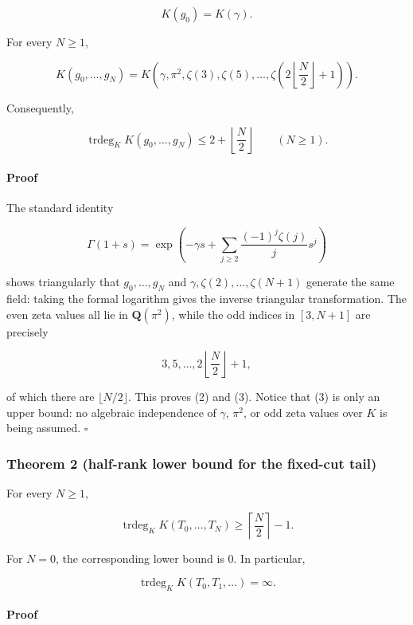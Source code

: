 \[
 K(g_0)=K(\gamma).
\]

For every \(N\ge1\),

\[
 \boxed{
 K(g_0,\ldots,g_N)
 =K\!\left(\gamma,\pi^2,\zeta(3),\zeta(5),\ldots,
 \zeta\!\left(2\left\lfloor\frac N2\right\rfloor+1\right)\right).}       \tag{GT-2}
\]

Consequently,

\[
 \operatorname{trdeg}_K K(g_0,\ldots,g_N)
 \le 2+\left\lfloor\frac N2\right\rfloor \qquad(N\ge1).                 \tag{GT-3}
\]

\paragraph{Proof}

The standard identity

\[
 \Gamma(1+s)=
 \exp\!\left(-\gamma s+\sum_{j\ge2}\frac{(-1)^j\zeta(j)}j s^j\right)
\]

shows triangularly that \(g_0,\ldots,g_N\) and
\(\gamma,\zeta(2),\ldots,\zeta(N+1)\) generate the same field: taking the
formal logarithm gives the inverse triangular transformation. The even zeta
values all lie in \(\mathbf Q(\pi^2)\), while the odd indices in
\([3,N+1]\) are precisely

\[
 3,5,\ldots,2\left\lfloor\frac N2\right\rfloor+1,
\]

of which there are \(\lfloor N/2\rfloor\). This proves (2) and (3). Notice
that (3) is only an upper bound: no algebraic independence of \(\gamma\),
\(\pi^2\), or odd zeta values over \(K\) is being assumed. \(\square\)

\subsubsection{Theorem 2 (half-rank lower bound for the fixed-cut tail)}

For every \(N\ge1\),

\[
 \boxed{
 \operatorname{trdeg}_K K(T_0,\ldots,T_N)
 \ge \left\lceil\frac N2\right\rceil-1.}                                  \tag{GT-4}
\]

For \(N=0\), the corresponding lower bound is \(0\). In particular,

\[
 \operatorname{trdeg}_K K(T_0,T_1,\ldots)=\infty.                          \tag{GT-5}
\]

\paragraph{Proof}


